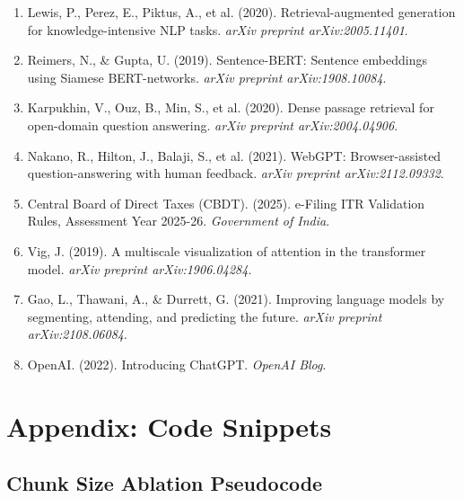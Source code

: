 \documentclass[11pt,a4paper]{article}
\begin{document}
\begin{enumerate}
    \item Lewis, P., Perez, E., Piktus, A., et al. (2020). Retrieval-augmented generation for knowledge-intensive NLP tasks. \textit{arXiv preprint arXiv:2005.11401}.
    
    \item Reimers, N., \& Gupta, U. (2019). Sentence-BERT: Sentence embeddings using Siamese BERT-networks. \textit{arXiv preprint arXiv:1908.10084}.
    
    \item Karpukhin, V., Ouz, B., Min, S., et al. (2020). Dense passage retrieval for open-domain question answering. \textit{arXiv preprint arXiv:2004.04906}.
    
    \item Nakano, R., Hilton, J., Balaji, S., et al. (2021). WebGPT: Browser-assisted question-answering with human feedback. \textit{arXiv preprint arXiv:2112.09332}.
    
    \item Central Board of Direct Taxes (CBDT). (2025). e-Filing ITR Validation Rules, Assessment Year 2025-26. \textit{Government of India}.
    
    \item Vig, J. (2019). A multiscale visualization of attention in the transformer model. \textit{arXiv preprint arXiv:1906.04284}.
    
    \item Gao, L., Thawani, A., \& Durrett, G. (2021). Improving language models by segmenting, attending, and predicting the future. \textit{arXiv preprint arXiv:2108.06084}.
    
    \item OpenAI. (2022). Introducing ChatGPT. \textit{OpenAI Blog}.
\end{enumerate}

\appendix

\section{Appendix: Code Snippets}
\label{app:code}

\subsection{Chunk Size Ablation Pseudocode}
\end{document}
